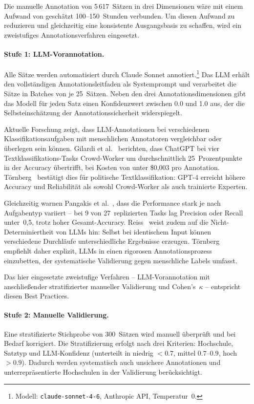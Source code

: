 Die manuelle Annotation von 5\,617~Sätzen in drei Dimensionen wäre mit einem Aufwand von geschätzt 100--150~Stunden verbunden.
Um diesen Aufwand zu reduzieren und gleichzeitig eine konsistente Ausgangsbasis zu schaffen, wird ein zweistufiges Annotationsverfahren eingesetzt.

\paragraph{Stufe 1: LLM-Vorannotation.}
Alle Sätze werden automatisiert durch Claude Sonnet annotiert.\footnote{Modell: \texttt{claude-sonnet-4-6}, Anthropic API, Temperatur~0.}
Das LLM erhält den vollständigen Annotationsleitfaden als Systemprompt und verarbeitet die Sätze in Batches von je 25~Sätzen.
Neben den drei Annotationsdimensionen gibt das Modell für jeden Satz einen Konfidenzwert zwischen 0.0 und 1.0 aus, der die Selbsteinschätzung der Annotationssicherheit widerspiegelt.

Aktuelle Forschung zeigt, dass LLM-Annotationen bei verschiedenen Klassifikationsaufgaben mit menschlichen Annotatoren vergleichbar oder überlegen sein können.
Gilardi et al.~\cite{gilardi2023chatgpt} berichten, dass ChatGPT bei vier Textklassifikations-Tasks Crowd-Worker um durchschnittlich 25~Prozentpunkte in der Accuracy übertrifft, bei Kosten von unter \$0,003 pro Annotation.
Törnberg~\cite{tornberg2025llm} bestätigt dies für politische Textklassifikation: GPT-4 erreicht höhere Accuracy und Reliabilität als sowohl Crowd-Worker als auch trainierte Experten.

Gleichzeitig warnen Pangakis et al.~\cite{pangakis2023validation}, dass die Performance stark je nach Aufgabentyp variiert -- bei 9 von 27~replizierten Tasks lag Precision oder Recall unter~0,5, trotz hoher Gesamt-Accuracy.
Reiss~\cite{reiss2023testing} weist zudem auf die Nicht-Determiniertheit von LLMs hin: Selbst bei identischem Input können verschiedene Durchläufe unterschiedliche Ergebnisse erzeugen.
Törnberg~\cite{tornberg2024bestpractices} empfiehlt daher explizit, LLMs in einen rigorosen Annotationsprozess einzubetten, der systematische Validierung gegen menschliche Labels umfasst.

Das hier eingesetzte zweistufige Verfahren -- LLM-Vorannotation mit anschließender stratifizierter manueller Validierung und Cohen's~$\kappa$ -- entspricht diesen Best Practices.

\paragraph{Stufe 2: Manuelle Validierung.}
Eine stratifizierte Stichprobe von 300~Sätzen wird manuell überprüft und bei Bedarf korrigiert.
Die Stratifizierung erfolgt nach drei Kriterien: Hochschule, Satztyp und LLM-Konfidenz (unterteilt in niedrig $< 0.7$, mittel $0.7$--$0.9$, hoch $> 0.9$).
Dadurch werden systematisch auch unsichere Annotationen und unterrepräsentierte Hochschulen in der Validierung berücksichtigt.

